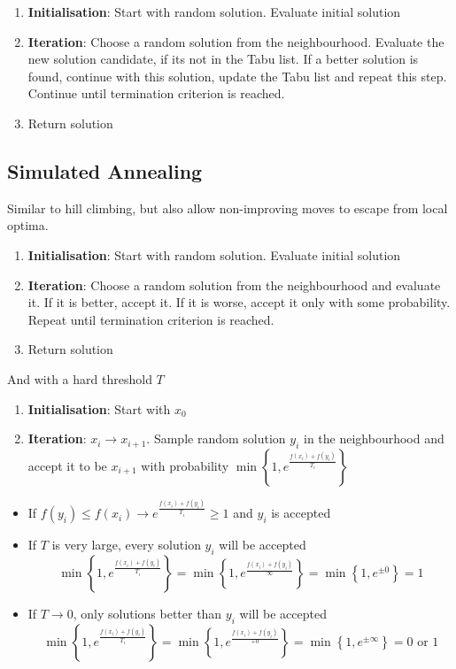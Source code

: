\documentclass[11pt]{article}
\begin{document}
\begin{enumerate}
	\item \textbf{Initialisation}: Start with random solution. Evaluate initial solution
	\item \textbf{Iteration}: Choose a random solution from the neighbourhood. Evaluate the new solution candidate, if its not in the Tabu list. If a better solution is found, continue with this solution, update the Tabu list and repeat this step. Continue until termination criterion is reached.
	\item Return solution
\end{enumerate}

\subsection{Simulated Annealing}
Similar to hill climbing, but also allow non-improving moves to escape from local optima.

\begin{enumerate}
	\item \textbf{Initialisation}: Start with random solution. Evaluate initial solution
	\item \textbf{Iteration}: Choose a random solution from the neighbourhood and evaluate it. If it is better, accept it. If it is worse, accept it only with some probability. Repeat until termination criterion is reached.
	\item Return solution
\end{enumerate}

\noindent
And with a hard threshold $T$
\begin{enumerate}
	\item \textbf{Initialisation}: Start with $x_0$
	\item \textbf{Iteration}: $x_i \rightarrow x_{i+1}$. Sample random solution $y_i$ in the neighbourhood and accept it to be $x_{i+1}$ with probability $\min\left\{1, e^{\frac{f(x_i) + f(y_i)}{T_i}}\right\}$
\end{enumerate}

\noindent
\begin{itemize}
	\item If $f(y_i) \leq f(x_i) \rightarrow e^{\frac{f(x_i) + f(y_i)}{T_i}} \geq 1$ and $y_i$ is accepted
	\item If $T$ is very large, every solution $y_i$ will be accepted
	\begin{equation*}
		\min\left\{1, e^{\frac{f(x_i) + f(y_i)}{T_i}}\right\} = \min\left\{1, e^{\frac{f(x_i) + f(y_i)}{\infty}}\right\} = \min\left\{1, e^{\pm 0}\right\} = 1
	\end{equation*}
	\item If $T\rightarrow 0$, only solutions better than $y_i$ will be accepted
	\begin{equation*}
	\min\left\{1, e^{\frac{f(x_i) + f(y_i)}{T_i}}\right\} = \min\left\{1, e^{\frac{f(x_i) + f(y_i)}{+0}}\right\} = \min\left\{1, e^{\pm \infty}\right\} = 0\text{ or }1
	\end{equation*}
\end{itemize}
\end{document}
